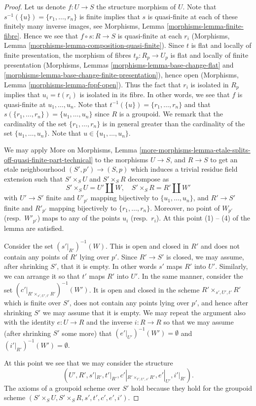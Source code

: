 \begin{proof}
Let us denote $f : U \to S$ the structure morphism of $U$.
Note that $s^{-1}(\{u\}) = \{r_1, \ldots, r_n\}$
is finite implies that $s$ is quasi-finite
at each of these finitely many inverse images, see
Morphisms, Lemma \ref{morphisms-lemma-finite-fibre}.
Hence we see that $f \circ s : R \to S$ is quasi-finite at each $r_i$
(Morphisms, Lemma \ref{morphisms-lemma-composition-quasi-finite}).
Since $t$ is flat and locally of finite presentation,
the morphism of fibres $t_p : R_p \to U_p$ is flat and locally of
finite presentation (Morphisms,
Lemmas \ref{morphisms-lemma-base-change-flat} and
\ref{morphisms-lemma-base-change-finite-presentation}),
hence open (Morphisms,
Lemma \ref{morphisms-lemma-fppf-open}). Thus the fact that $r_i$ is isolated
in $R_p$ implies that $u_i = t(r_i)$ is isolated in its fibre.
In other words, we see that $f$ is quasi-finite at $u_1, \ldots, u_n$.
Note that $t^{-1}(\{u\}) = \{r_1, \ldots, r_n\}$ and that
$s(\{r_1, \ldots, r_n\}) = \{u_1, \ldots, u_n\}$ since $R$ is a
groupoid. We remark that the cardinality of the set
$\{r_1, \ldots, r_n\}$ is in general greater than the cardinality
of the set $\{u_1, \ldots, u_n\}$. Note that $u \in \{u_1, \ldots, u_n\}$.

\medskip\noindent
We may apply
More on Morphisms,
Lemma \ref{more-morphisms-lemma-etale-splits-off-quasi-finite-part-technical}
to the morphisms
$U \to S$, and $R \to S$ to get an etale neighbourhood
$(S', p') \to (S, p)$ which induces a trivial residue field extension
such that $S' \times_S U$ and $S' \times_S R$ decompose as
$$
S' \times_S U = U' \coprod W, \quad
S' \times_S R = R' \coprod W'
$$
with $U' \to S'$ finite and
$U'_{p'}$ mapping bijectively to $\{u_1, \ldots, u_n\}$, and
$R' \to S'$ finite and
$R'_{p'}$ mapping bijectively to $\{r_1, \ldots, r_n\}$.
Moreover, no point of $W_{p'}$ (resp.\ $W'_{p'}$) maps to
any of the points $u_i$ (resp.\ $r_i$). At this point (1) -- (4) of the
lemma are satisfied.

\medskip\noindent
Consider the set $(s'|_{R'})^{-1}(W)$. This is open and closed in $R'$
and does not contain any points of $R'$ lying over $p'$. Since
$R' \to S'$ is closed, we may assume, after shrinking $S'$, that
it is empty. In other words $s'$ maps $R'$ into $U'$.
Similarly, we can arrange it so that $t'$ maps $R'$ into $U'$.
In the same manner, consider the set
$(c'|_{R' \times_{s', U', t'} R'})^{-1}(W')$.
It is open and closed in the scheme $R' \times_{s', U', t'} R'$
which is finite over $S'$, does not contain any points lying
over $p'$, and hence after shrinking $S'$ we may assume
that it is empty. We may repeat the argument also with the identity
$e : U \to R$ and the inverse $i : R \to R$ so that we may assume
(after shrinking $S'$ some more) that $(e'|_{U'})^{-1}(W') = \emptyset$
and $(i'|_{R'})^{-1}(W') = \emptyset$.

\medskip\noindent
At this point we see that we may consider the structure
$$
(U', R', s'|_{R'}, t'|_{R'}, c'|_{R' \times_{t', U', s'} R'},
e'|_{U'}, i'|_{R'}).
$$
The axioms of a groupoid scheme over $S'$ hold
because they hold for the groupoid scheme
$(S' \times_S U, S' \times_S R, s', t', c', e', i')$.
\end{proof}

